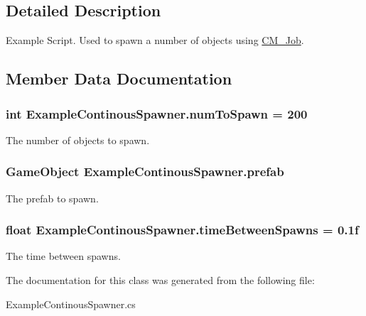 \subsection{Detailed Description}
Example Script. Used to spawn a number of objects using \hyperlink{class_c_m___job}{C\+M\+\_\+\+Job}. 



\subsection{Member Data Documentation}
\hypertarget{class_example_continous_spawner_af4226a3d4c13b1e447003b3a45e5638f}{}
\subsubsection[{num\+To\+Spawn}]{\setlength{\rightskip}{0pt plus 5cm}int Example\+Continous\+Spawner.\+num\+To\+Spawn = 200}\label{class_example_continous_spawner_af4226a3d4c13b1e447003b3a45e5638f}


The number of objects to spawn. 

\hypertarget{class_example_continous_spawner_ad4617f03c5d944453742b8ce30b25396}{}
\subsubsection[{prefab}]{\setlength{\rightskip}{0pt plus 5cm}Game\+Object Example\+Continous\+Spawner.\+prefab}\label{class_example_continous_spawner_ad4617f03c5d944453742b8ce30b25396}


The prefab to spawn. 

\hypertarget{class_example_continous_spawner_a99d962ed337668df7b9ce0a99042eec1}{}
\subsubsection[{time\+Between\+Spawns}]{\setlength{\rightskip}{0pt plus 5cm}float Example\+Continous\+Spawner.\+time\+Between\+Spawns = 0.\+1f}\label{class_example_continous_spawner_a99d962ed337668df7b9ce0a99042eec1}


The time between spawns. 



The documentation for this class was generated from the following file\+:\begin{DoxyCompactItemize}
\item 
Example\+Continous\+Spawner.\+cs\end{DoxyCompactItemize}
